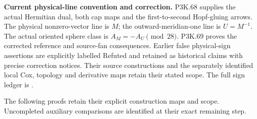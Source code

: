 \par\noindent\textbf{Current physical-line convention and correction.}
P3K.68 supplies the actual Hermitian dual, both cap maps and the
first-to-second Hopf-gluing arrows. The physical nonzero-vector line
is \(M\); the outward-meridian-one line is \(U=M^{-1}\).
The actual oriented sphere class is \(A_M=-A_U\pmod{28}\).
P3K.69 proves the corrected reference and source-fan consequences.
Earlier false physical-sign assertions are explicitly labelled
Refuted and retained as historical claims with precise correction
notices. Their source constructions and the separately identified
local Cox, topology and derivative maps retain their stated scope.
The full sign ledger is .
\par\medskip

\providecommand{\tightlist}{\setlength{\itemsep}{0pt}\setlength{\parskip}{0pt}}
\noindent The following proofs retain their explicit construction maps and scope. Uncompleted auxiliary comparisons are identified at their exact remaining step.
